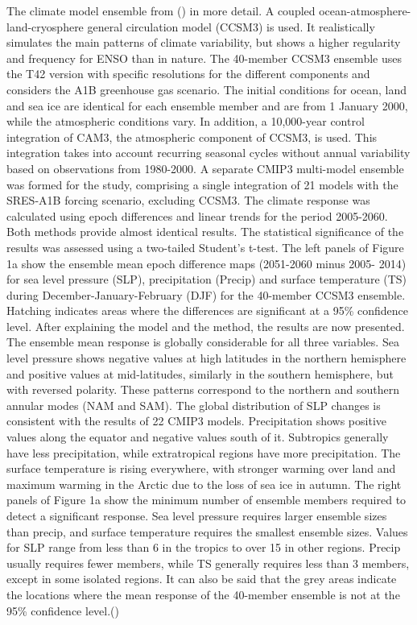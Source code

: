 \documentclass[
]{krantz}
\begin{document}
The climate model ensemble from (\citet{deser}) in more detail. A coupled ocean-atmosphere-land-cryosphere general circulation model (CCSM3) is used. It realistically simulates the main patterns of climate variability, but shows a higher regularity and frequency for ENSO than in nature. The 40-member CCSM3 ensemble uses the T42 version with specific resolutions for the different components and considers the A1B greenhouse gas scenario. The initial conditions for ocean, land and sea ice are identical for each ensemble member and are from 1 January 2000, while the atmospheric conditions vary.
In addition, a 10,000-year control integration of CAM3, the atmospheric component of CCSM3, is used. This integration takes into account recurring seasonal cycles without annual variability based on observations from 1980-2000.
A separate CMIP3 multi-model ensemble was formed for the study, comprising a single integration of 21 models with the SRES-A1B forcing scenario, excluding CCSM3. The climate response was calculated using epoch differences and linear trends for the period 2005-2060. Both methods provide almost identical results. The statistical significance of the results was assessed using a two-tailed Student's t-test.
The left panels of Figure 1a show the ensemble mean epoch difference maps (2051-2060 minus 2005- 2014) for sea level pressure (SLP), precipitation (Precip) and surface temperature (TS) during December-January-February (DJF) for the 40-member CCSM3 ensemble. Hatching indicates areas where the differences are significant at a 95\% confidence level.
After explaining the model and the method, the results are now presented. The ensemble mean response is globally considerable for all three variables. Sea level pressure shows negative values at high latitudes in the northern hemisphere and positive values at mid-latitudes, similarly in the southern hemisphere, but with reversed polarity. These patterns correspond to the northern and southern annular modes (NAM and SAM). The global distribution of SLP changes is consistent with the results of 22 CMIP3 models.
Precipitation shows positive values along the equator and negative values south of it. Subtropics generally have less precipitation, while extratropical regions have more precipitation. The surface temperature is rising everywhere, with stronger warming over land and maximum warming in the Arctic due to the loss of sea ice in autumn.
The right panels of Figure 1a show the minimum number of ensemble members required to detect a significant response. Sea level pressure requires larger ensemble sizes than precip, and surface temperature requires the smallest ensemble sizes. Values for SLP range from less than 6 in the tropics to over 15 in other regions. Precip usually requires fewer members, while TS generally requires less than 3 members, except in some isolated regions. It can also be said that the grey areas indicate the locations where the mean response of the 40-member ensemble is not at the 95\% confidence level.(\citet{deser})
\end{document}
